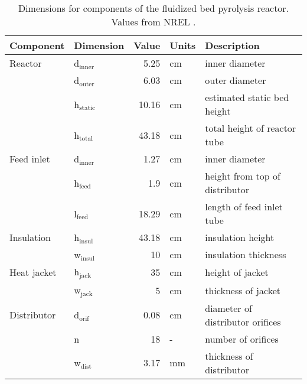 \begin{table}[H]
    \centering
    \caption{Dimensions for components of the fluidized bed pyrolysis reactor. Values from NREL \cite{French-2019}.}
    \label{tab:dimensions}
    \begin{tabular}{llrll}
        \toprule
        Component & Dimension & Value & Units & Description \\
        \midrule
        Reactor
            & d$_\textrm{inner}$ & 5.25 & cm & inner diameter \\
            & d$_\textrm{outer}$ & 6.03 & cm & outer diameter \\
            & h$_\textrm{static}$ & 10.16 & cm & estimated static bed height \\
            & h$_\textrm{total}$ & 43.18 & cm & total height of reactor tube \\
        Feed inlet
            & d$_\textrm{inner}$ & 1.27 & cm & inner diameter \\
            & h$_\textrm{feed}$ & 1.9 & cm & height from top of distributor \\
            & l$_\textrm{feed}$ & 18.29 & cm & length of feed inlet tube \\
        Insulation
            & h$_\textrm{insul}$ & 43.18 & cm & insulation height \\
            & w$_\textrm{insul}$ & 10 & cm & insulation thickness \\
        Heat jacket
            & h$_\textrm{jack}$ & 35 & cm & height of jacket \\
            & w$_\textrm{jack}$ & 5 & cm & thickness of jacket \\
        Distributor
            & d$_\textrm{orif}$ & 0.08 & cm & diameter of distributor orifices \\
            & n & 18 & - & number of orifices \\
            & w$_\textrm{dist}$ & 3.17 & mm & thickness of distributor \\
        \bottomrule
    \end{tabular}
\end{table}

